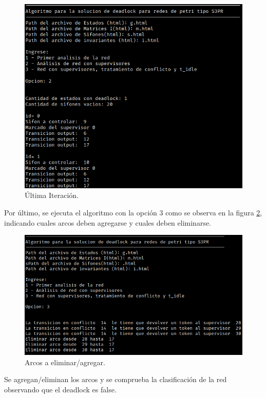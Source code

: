 \begin{figure} [H]
    \centering
    \includegraphics[width=\textwidth]{Figures/apendiceB/Py-POPN8.png}
    \caption{Última Iteración.}
    \label{fig:b-popn8}
\end{figure}

Por último, se ejecuta el algoritmo con la opción 3 como se observa en la figura \ref{fig:b-popn9}, indicando cuales arcos deben agregarse y cuales deben eliminarse. 

\begin{figure} [H]
    \centering
    \includegraphics[width=\textwidth]{Figures/apendiceB/Py-POPN9.png}
    \caption{Arcos a eliminar/agregar.}
    \label{fig:b-popn9}
\end{figure}

Se agregan/eliminan los arcos y se comprueba la clasificación de la red observando que el deadlock es false. 

